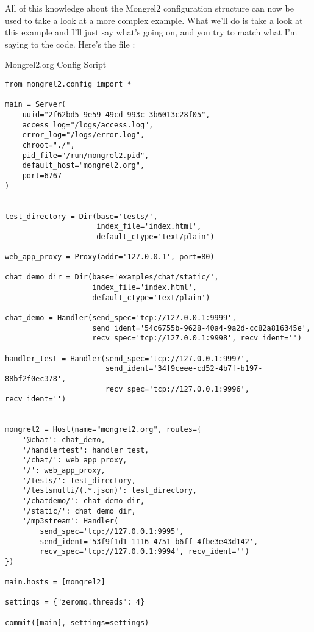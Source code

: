 All of this knowledge about the Mongrel2 configuration structure can now be used to take a look at 
a more complex example.  What we'll do is take a look at this example and I'll just say what's 
going on, and you try to match what I'm saying to the code.  Here's the file :

\begin{code}{Mongrel2.org Config Script}
\begin{verbatim}
from mongrel2.config import *

main = Server(
    uuid="2f62bd5-9e59-49cd-993c-3b6013c28f05",
    access_log="/logs/access.log",
    error_log="/logs/error.log",
    chroot="./",
    pid_file="/run/mongrel2.pid",
    default_host="mongrel2.org",
    port=6767
)


test_directory = Dir(base='tests/',
                     index_file='index.html',
                     default_ctype='text/plain')

web_app_proxy = Proxy(addr='127.0.0.1', port=80)

chat_demo_dir = Dir(base='examples/chat/static/', 
                    index_file='index.html', 
                    default_ctype='text/plain')

chat_demo = Handler(send_spec='tcp://127.0.0.1:9999',
                    send_ident='54c6755b-9628-40a4-9a2d-cc82a816345e',
                    recv_spec='tcp://127.0.0.1:9998', recv_ident='')

handler_test = Handler(send_spec='tcp://127.0.0.1:9997',
                       send_ident='34f9ceee-cd52-4b7f-b197-88bf2f0ec378',
                       recv_spec='tcp://127.0.0.1:9996', recv_ident='')


mongrel2 = Host(name="mongrel2.org", routes={
    '@chat': chat_demo,
    '/handlertest': handler_test,
    '/chat/': web_app_proxy,
    '/': web_app_proxy,
    '/tests/': test_directory,
    '/testsmulti/(.*.json)': test_directory,
    '/chatdemo/': chat_demo_dir,
    '/static/': chat_demo_dir,
    '/mp3stream': Handler(
        send_spec='tcp://127.0.0.1:9995',
        send_ident='53f9f1d1-1116-4751-b6ff-4fbe3e43d142',
        recv_spec='tcp://127.0.0.1:9994', recv_ident='')
})

main.hosts = [mongrel2]

settings = {"zeromq.threads": 4}

commit([main], settings=settings)
\end{verbatim}
\end{code}

